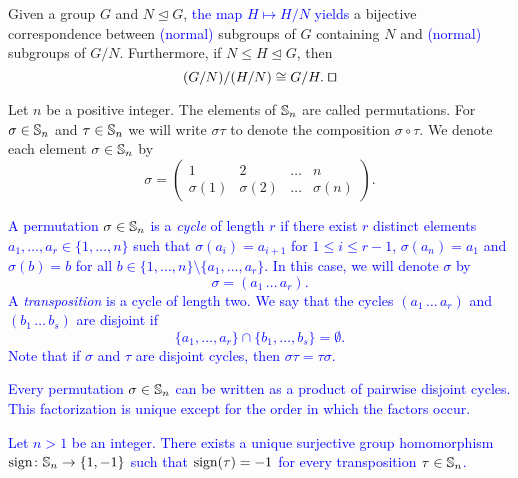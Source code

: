\begin{theorem} 
Given a group $G$ and $N\unlhd G$, 
\textcolor{blue}{the map $H\mapsto H/N$ yields} 
a bijective correspondence between \textcolor{blue}{(normal)} 
subgroups of $G$ containing $N$ and \textcolor{blue}{(normal)} subgroups of $G/N$. 
Furthermore, if $N\leq H\unlhd G$, then
\[
(G/N)/(H/N)\cong G/H.\;\qed
\]
\end{theorem}

Let $n$ be a positive integer. The elements of $\mathbb{S}_n$ are called permutations. For $\sigma\in\mathbb{S}_n$ and $\tau\in\mathbb{S}_n$ 
we will write $\sigma\tau$ to denote the composition $\sigma\circ\tau$. 
We denote each element $\sigma\in\mathbb{S}_n$ by
\[ 
\sigma=\left(\begin{array}{cccc}
1&2&\ldots&n\\
\sigma(1)&\sigma(2)&\ldots&\sigma(n)\end{array}\right).
\]

\textcolor{blue}{
A permutation $\sigma\in \mathbb{S}_n$ is a {\em cycle} of length $r$ 
if there exist $r$ distinct elements 
$a_1,\dots ,a_r\in\{ 1,\dots, n\}$ such that $\sigma(a_i)=a_{i+1}$ for $1\leq i\leq r-1$, $\sigma(a_n)=a_1$ and $\sigma(b)=b$ 
for all $b\in \{1,\dots, n\}\setminus\{ a_1,\dots ,a_r\}$. In this case, we will denote $\sigma$ by
\[ 
\sigma=(a_1\,\dots\, a_r).
\]
}
\textcolor{blue}{A {\em transposition} is a cycle of length two. 
We say that the cycles
$(a_1\,\dots\, a_r)$ and $(b_1\,\dots\, b_s)$ are disjoint if 
\[
\{ a_1,\dots, a_r\}\cap \{ b_1,\dots, b_s\}=\emptyset.
\]
Note that if $\sigma$ and $\tau$ are disjoint cycles, then $\sigma\tau=\tau\sigma$.}

\begin{theorem}
    \textcolor{blue}{
    Every permutation $\sigma\in\mathbb{S}_n$ can be written as a product of pairwise disjoint cycles.
    This factorization is unique except for the order in which the factors occur.}
\end{theorem}

\begin{theorem}
    \textcolor{blue}{
    Let $n>1$ be an integer. There exists a unique surjective group homomorphism 
    $\operatorname{sign}\colon \mathbb{S}_n\rightarrow \{ 1,-1\}$
    such that $\operatorname{sign}(\tau)=-1$ for every transposition $\tau\in\mathbb{S}_n$.}
\end{theorem}

